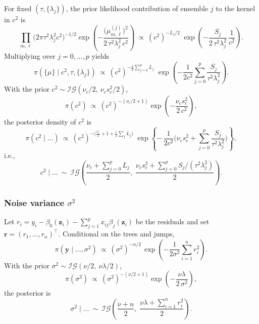 \documentclass[11pt]{article}
\newcommand{\by}{\bm{y}}
\newcommand{\bz}{\bm{z}}
\newcommand{\br}{\bm{r}}
\theoremstyle{plain}
\theoremstyle{definition}
\theoremstyle{plain}
\begin{document}
For fixed $(\tau,\{\lambda_j\})$, the prior likelihood contribution of ensemble $j$ to the kernel in $c^2$ is
\[
\prod_{m,\ell} \big(2\pi \tau^2\lambda_j^2 c^2\big)^{-1/2}
\exp\!\left(-\frac{\big(\mu^{(j)}_{m,\ell}\big)^2}{2\,\tau^2\lambda_j^2\,c^2}\right)
\ \propto\ (c^2)^{-L_j/2}\;\exp\!\left(-\frac{S_j}{2\,\tau^2\lambda_j^2}\,\frac{1}{c^2}\right).
\]
Multiplying over $j=0,\dots,p$ yields
\[
\pi(\{\mu\}\mid c^2,\tau,\{\lambda_j\})\ \propto\ (c^2)^{-\frac12\sum_{j=0}^p L_j}\;
\exp\!\left(-\frac{1}{2c^2}\sum_{j=0}^p \frac{S_j}{\tau^2\lambda_j^2}\right).
\]
With the prior \(c^2\sim \mathcal{IG}(\nu_c/2,\ \nu_c s_c^2/2)\),
\[
\pi(c^2)\ \propto\ (c^2)^{-(\nu_c/2+1)}\exp\!\left(-\frac{\nu_c s_c^2}{2\,c^2}\right),
\]
the posterior density of $c^2$ is
\[
\pi(c^2\mid \ldots)\ \propto\ (c^2)^{-\big(\frac{\nu_c}{2}+1+\frac12\sum_j L_j\big)}\;
\exp\!\left\{-\,\frac{1}{2c^2}\Big(\nu_c s_c^2+\sum_{j=0}^p \frac{S_j}{\tau^2\lambda_j^2}\Big)\right\},
\]
i.e.,
\begin{equation}
\label{eqS:c2update}
c^2 \mid \ldots \ \sim\ \mathcal{IG}\!\left(\frac{\nu_c+\sum_{j=0}^p L_j}{2},\;
\frac{\nu_c s_c^2 + \sum_{j=0}^p S_j/(\tau^2\lambda_j^2)}{2}\right).
\end{equation}


\subsubsection*{Noise variance $\sigma^2$}
Let $r_i = y_i - \beta_0(\bz_i) - \sum_{j=1}^p x_{ij}\beta_j(\bz_i)$ be the residuals and set $\br=(r_1,\dots,r_n)^\top$.
Conditional on the trees and jumps,
\[
\pi(\by\mid\ldots,\sigma^2) \ \propto\ (\sigma^2)^{-n/2}\,
\exp\!\left(-\frac{1}{2\sigma^2}\sum_{i=1}^n r_i^2\right).
\]
With the prior \(\sigma^2\sim \mathcal{IG}(\nu/2,\ \nu\lambda/2)\),
\[
\pi(\sigma^2)\ \propto\ (\sigma^2)^{-(\nu/2+1)}\exp\!\left(-\frac{\nu\lambda}{2\,\sigma^2}\right),
\]
the posterior is
\begin{equation}
\label{eqS:sigma2}
\sigma^2 \mid \ldots \ \sim\ \mathcal{IG}\!\left(\frac{\nu+n}{2},\;
\frac{\nu\lambda + \sum_{i=1}^n r_i^2}{2}\right).
\end{equation}
\end{document}
